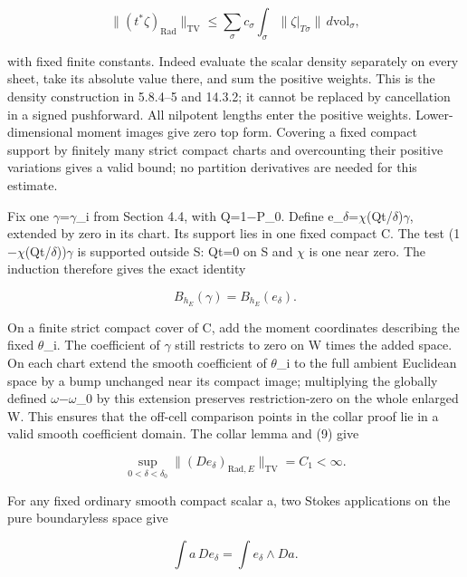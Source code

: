 \documentclass[
  10pt,
]{article}
\begin{document}
\[
 \|(t^*\zeta)_{\mathrm{Rad}}\|_{\mathrm{TV}}
 \le\sum_{\sigma}c_\sigma
        \int_\sigma\|\zeta|_{T\sigma}\|\,d\mathrm{vol}_\sigma,  \tag{9}
\]

with fixed finite constants. Indeed evaluate the scalar density
separately on every sheet, take its absolute value there, and sum the
positive weights. This is the density construction in 5.8.4--5 and
14.3.2; it cannot be replaced by cancellation in a signed pushforward.
All nilpotent lengths enter the positive weights. Lower-dimensional
moment images give zero top form. Covering a fixed compact support by
finitely many strict compact charts and overcounting their positive
variations gives a valid bound; no partition derivatives are needed for
this estimate.

Fix one \ensuremath{\gamma}=\ensuremath{\gamma}\_i from Section 4.4, with Q=1\ensuremath{-}P\_0. Define e\_\ensuremath{\delta}=\ensuremath{\chi}(Qt/\ensuremath{\delta})\ensuremath{\gamma},
extended by zero in its chart. Its support lies in one fixed compact C.
The test (1\ensuremath{-}\ensuremath{\chi}(Qt/\ensuremath{\delta}))\ensuremath{\gamma} is supported outside S: Qt=0 on S and \ensuremath{\chi} is one
near zero. The induction therefore gives the exact identity

\[
                  B_{h_E}(\gamma)=B_{h_E}(e_\delta).        \tag{10}
\]

On a finite strict compact cover of C, add the moment coordinates
describing the fixed \ensuremath{\theta}\_i. The coefficient of \ensuremath{\gamma} still restricts to zero
on W times the added space. On each chart extend the smooth coefficient
of \ensuremath{\theta}\_i to the full ambient Euclidean space by a bump unchanged near its
compact image; multiplying the globally defined \ensuremath{\omega}\ensuremath{-}\ensuremath{\omega}\_0 by this extension
preserves restriction-zero on the whole enlarged W. This ensures that
the off-cell comparison points in the collar proof lie in a valid smooth
coefficient domain. The collar lemma and (9) give

\[
     \sup_{0<\delta<\delta_0}
       \|(De_\delta)_{\mathrm{Rad},E}\|_{\mathrm{TV}}=C_1<\infty. \tag{11}
\]

For any fixed ordinary smooth compact scalar a, two Stokes applications
on the pure boundaryless space give

\[
                   \int a\,De_\delta
                       =\int e_\delta\wedge Da.             \tag{12}
\]
\end{document}

